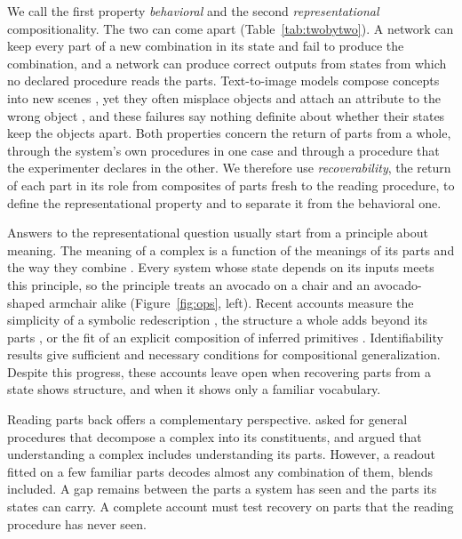 \documentclass[10pt]{article}
\theoremstyle{plain}
\theoremstyle{remark}
\begin{document}
We call the first property \emph{behavioral} and the second \emph{representational} compositionality. The two can come apart (Table~\ref{tab:twobytwo}). A network can keep every part of a new combination in its state and fail to produce the combination, and a network can produce correct outputs from states from which no declared procedure reads the parts. Text-to-image models compose concepts into new scenes \citep{ramesh2021,okawa2023}, yet they often misplace objects \citep{conwell2022} and attach an attribute to the wrong object \citep{rassin2022}, and these failures say nothing definite about whether their states keep the objects apart. Both properties concern the return of parts from a whole, through the system's own procedures in one case and through a procedure that the experimenter declares in the other. We therefore use \emph{recoverability}, the return of each part in its role from composites of parts fresh to the reading procedure, to define the representational property and to separate it from the behavioral one.

Answers to the representational question usually start from a principle about meaning. The meaning of a complex is a function of the meanings of its parts and the way they combine \citep{montague1970}. Every system whose state depends on its inputs meets this principle, so the principle treats an avocado on a chair and an avocado-shaped armchair alike (Figure~\ref{fig:ops}, left). Recent accounts measure the simplicity of a symbolic redescription \citep{elmoznino2024}, the structure a whole adds beyond its parts \citep{elmoznino2026}, or the fit of an explicit composition of inferred primitives \citep{andreas2019}. Identifiability results give sufficient \citep{lachapelle2023,wiedemer2024} and necessary \citep{uselis2026} conditions for compositional generalization. Despite this progress, these accounts leave open when recovering parts from a state shows structure, and when it shows only a familiar vocabulary.

Reading parts back offers a complementary perspective. \citet{vangelder1990} asked for general procedures that decompose a complex into its constituents, and \citet{fodor2002} argued that understanding a complex includes understanding its parts. However, a readout fitted on a few familiar parts decodes almost any combination of them, blends included. A gap remains between the parts a system has seen and the parts its states can carry. A complete account must test recovery on parts that the reading procedure has never seen.
\end{document}
